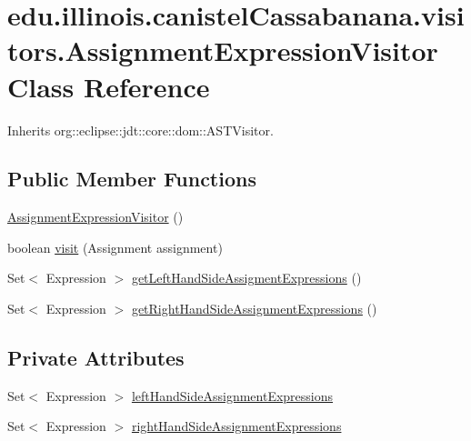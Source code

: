 \hypertarget{classedu_1_1illinois_1_1canistelCassabanana_1_1visitors_1_1AssignmentExpressionVisitor}{
\section{edu.illinois.canistelCassabanana.visitors.AssignmentExpressionVisitor Class Reference}
\label{classedu_1_1illinois_1_1canistelCassabanana_1_1visitors_1_1AssignmentExpressionVisitor}
}


Inherits org::eclipse::jdt::core::dom::ASTVisitor.

\subsection*{Public Member Functions}
\begin{DoxyCompactItemize}
\item 
\hyperlink{classedu_1_1illinois_1_1canistelCassabanana_1_1visitors_1_1AssignmentExpressionVisitor_a5ea83b7421d24595a65560d133cdbccb}{AssignmentExpressionVisitor} ()
\item 
boolean \hyperlink{classedu_1_1illinois_1_1canistelCassabanana_1_1visitors_1_1AssignmentExpressionVisitor_ad339d0bcf7d83b92c4998808129ced2e}{visit} (Assignment assignment)
\item 
Set$<$ Expression $>$ \hyperlink{classedu_1_1illinois_1_1canistelCassabanana_1_1visitors_1_1AssignmentExpressionVisitor_a56dfe8499bdcff66e471f94e8dadad49}{getLeftHandSideAssigmentExpressions} ()
\item 
Set$<$ Expression $>$ \hyperlink{classedu_1_1illinois_1_1canistelCassabanana_1_1visitors_1_1AssignmentExpressionVisitor_a7894ac027ea5fc805fb0f547501c8311}{getRightHandSideAssignmentExpressions} ()
\end{DoxyCompactItemize}
\subsection*{Private Attributes}
\begin{DoxyCompactItemize}
\item 
Set$<$ Expression $>$ \hyperlink{classedu_1_1illinois_1_1canistelCassabanana_1_1visitors_1_1AssignmentExpressionVisitor_a0eb79a8557c115e43423caf3df7bef85}{leftHandSideAssignmentExpressions}
\item 
Set$<$ Expression $>$ \hyperlink{classedu_1_1illinois_1_1canistelCassabanana_1_1visitors_1_1AssignmentExpressionVisitor_a8cb4c3612d7c07ef325acdeff6401101}{rightHandSideAssignmentExpressions}
\end{DoxyCompactItemize}


